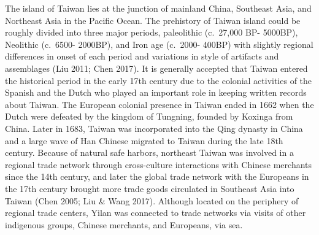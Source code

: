 \documentclass[]{article}
\begin{document}
The island of Taiwan lies at the junction of mainland China, Southeast
Asia, and Northeast Asia in the Pacific Ocean. The prehistory of Taiwan
island could be roughly divided into three major periods, paleolithic
(c.~27,000 BP- 5000BP), Neolithic (c.~6500- 2000BP), and Iron age
(c.~2000- 400BP) with slightly regional differences in onset of each
period and variations in style of artifacts and assemblages (Liu 2011;
Chen 2017). It is generally accepted that Taiwan entered the historical
period in the early 17th century due to the colonial activities of the
Spanish and the Dutch who played an important role in keeping written
records about Taiwan. The European colonial presence in Taiwan ended in
1662 when the Dutch were defeated by the kingdom of Tungning, founded by
Koxinga from China. Later in 1683, Taiwan was incorporated into the Qing
dynasty in China and a large wave of Han Chinese migrated to Taiwan
during the late 18th century. Because of natural safe harbors, northeast
Taiwan was involved in a regional trade network through cross-culture
interactions with Chinese merchants since the 14th century, and later
the global trade network with the Europeans in the 17th century brought
more trade goods circulated in Southeast Asia into Taiwan (Chen 2005;
Liu \& Wang 2017). Although located on the periphery of regional trade
centers, Yilan was connected to trade networks via visits of other
indigenous groups, Chinese merchants, and Europeans, via sea.
\end{document}
